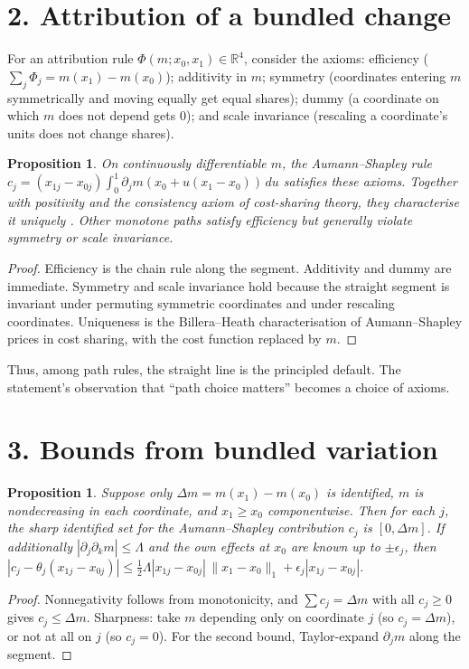 \documentclass[11pt]{article}
\newtheorem{proposition}[theorem]{Proposition}
\theoremstyle{definition}
\begin{document}
\section*{2. Attribution of a bundled change}
For an attribution rule $\Phi(m;x_0,x_1)\in\mathbb R^4$, consider the axioms: efficiency
($\sum_j\Phi_j=m(x_1)-m(x_0)$); additivity in $m$; symmetry (coordinates entering $m$ symmetrically and moving equally get
equal shares); dummy (a coordinate on which $m$ does not depend gets $0$); and scale invariance (rescaling a coordinate's units
does not change shares).
\begin{proposition}\label{prop:as}
On continuously differentiable $m$, the Aumann--Shapley rule
$c_j=(x_{1j}-x_{0j})\int_0^1\partial_jm(x_0+u(x_1-x_0))\,du$ satisfies these axioms. Together with positivity and the
consistency axiom of cost-sharing theory, they characterise it uniquely \cite{bh}. Other monotone paths satisfy efficiency
but generally violate symmetry or scale invariance.
\end{proposition}
\begin{proof}
Efficiency is the chain rule along the segment. Additivity and dummy are immediate. Symmetry and scale invariance hold
because the straight segment is invariant under permuting symmetric coordinates and under rescaling coordinates.
Uniqueness is the Billera--Heath characterisation of Aumann--Shapley prices in cost sharing, with the cost function
replaced by $m$.
\end{proof}
Thus, among path rules, the straight line is the principled default. The statement's observation that ``path choice
matters'' becomes a choice of axioms.

\section*{3. Bounds from bundled variation}
\begin{proposition}\label{prop:bounds}
Suppose only $\Delta m=m(x_1)-m(x_0)$ is identified, $m$ is nondecreasing in each coordinate, and $x_1\ge x_0$
componentwise. Then for each $j$, the sharp identified set for the Aumann--Shapley contribution $c_j$ is
$[0,\Delta m]$. If additionally $|\partial_j\partial_km|\le\Lambda$ and the own effects at $x_0$ are known up to
$\pm\epsilon_j$, then
$|c_j-\theta_j(x_{1j}-x_{0j})|\le\tfrac12\Lambda|x_{1j}-x_{0j}|\,\|x_1-x_0\|_1+\epsilon_j|x_{1j}-x_{0j}|$.
\end{proposition}
\begin{proof}
Nonnegativity follows from monotonicity, and $\sum c_j=\Delta m$ with all $c_j\ge0$ gives $c_j\le\Delta m$. Sharpness: take
$m$ depending only on coordinate $j$ (so $c_j=\Delta m$), or not at all on $j$ (so $c_j=0$). For the second bound,
Taylor-expand $\partial_jm$ along the segment.
\end{proof}
\end{document}
